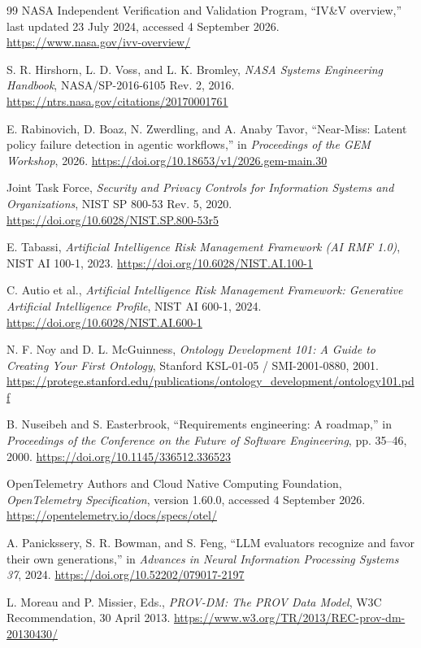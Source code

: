 \documentclass[10pt,a4paper]{article}
\begin{document}
\begin{thebibliography}{99}
NASA Independent Verification and Validation Program, ``IV\&V overview,'' last updated 23 July 2024, accessed 4 September 2026. \url{https://www.nasa.gov/ivv-overview/}

S. R. Hirshorn, L. D. Voss, and L. K. Bromley, \emph{NASA Systems Engineering Handbook}, NASA/SP-2016-6105 Rev. 2, 2016. \url{https://ntrs.nasa.gov/citations/20170001761}

E. Rabinovich, D. Boaz, N. Zwerdling, and A. Anaby Tavor, ``Near-Miss: Latent policy failure detection in agentic workflows,'' in \emph{Proceedings of the GEM Workshop}, 2026. \url{https://doi.org/10.18653/v1/2026.gem-main.30}

Joint Task Force, \emph{Security and Privacy Controls for Information Systems and Organizations}, NIST SP 800-53 Rev. 5, 2020. \url{https://doi.org/10.6028/NIST.SP.800-53r5}

E. Tabassi, \emph{Artificial Intelligence Risk Management Framework (AI RMF 1.0)}, NIST AI 100-1, 2023. \url{https://doi.org/10.6028/NIST.AI.100-1}

C. Autio et al., \emph{Artificial Intelligence Risk Management Framework: Generative Artificial Intelligence Profile}, NIST AI 600-1, 2024. \url{https://doi.org/10.6028/NIST.AI.600-1}

N. F. Noy and D. L. McGuinness, \emph{Ontology Development 101: A Guide to Creating Your First Ontology}, Stanford KSL-01-05 / SMI-2001-0880, 2001. \url{https://protege.stanford.edu/publications/ontology_development/ontology101.pdf}

B. Nuseibeh and S. Easterbrook, ``Requirements engineering: A roadmap,'' in \emph{Proceedings of the Conference on the Future of Software Engineering}, pp. 35--46, 2000. \url{https://doi.org/10.1145/336512.336523}

OpenTelemetry Authors and Cloud Native Computing Foundation, \emph{OpenTelemetry Specification}, version 1.60.0, accessed 4 September 2026. \url{https://opentelemetry.io/docs/specs/otel/}

A. Panickssery, S. R. Bowman, and S. Feng, ``LLM evaluators recognize and favor their own generations,'' in \emph{Advances in Neural Information Processing Systems 37}, 2024. \url{https://doi.org/10.52202/079017-2197}

L. Moreau and P. Missier, Eds., \emph{PROV-DM: The PROV Data Model}, W3C Recommendation, 30 April 2013. \url{https://www.w3.org/TR/2013/REC-prov-dm-20130430/}


\end{thebibliography}
\end{document}
